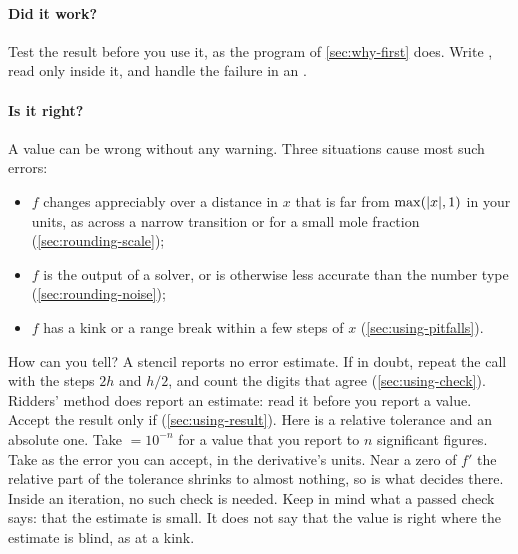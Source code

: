 \paragraph{Did it work?} Test the result before you use it, as the program of \cref{sec:why-first} does. Write
, read  only inside it, and handle the failure in an .

\paragraph{Is it right?} A value can be wrong without any warning. Three situations cause most such errors:
\begin{itemize}
  \item $f$ changes appreciably over a distance in $x$ that is far from $\max(\lvert x \rvert, 1)$ in your units, as across
    a narrow transition or for a small mole fraction (\cref{sec:rounding-scale});
  \item $f$ is the output of a solver, or is otherwise less accurate than the number type
    (\cref{sec:rounding-noise});
  \item $f$ has a kink or a range break within a few steps of $x$ (\cref{sec:using-pitfalls}).
\end{itemize}
How can you tell? A stencil reports no error estimate. If in doubt, repeat the call with the steps $2h$ and $h/2$,
and count the digits that agree (\cref{sec:using-check}). Ridders' method does report an estimate: read it before you
report a value. Accept the result  only if
 (\cref{sec:using-result}).
Here  is a relative tolerance and  an absolute one. Take  $= 10^{-n}$ for a value
that you report to $n$ significant figures. Take  as the error you can accept, in the derivative's units.
Near a zero of $f'$ the relative part of the tolerance shrinks to almost nothing, so  is what decides
there. Inside an iteration, no such check is needed. Keep in mind what a passed check says: that the estimate is
small. It does not say that the value is right where the estimate is blind, as at a kink.

